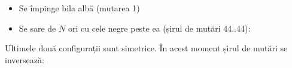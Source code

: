 \begin{itemize}

  \hfil\hdashrule{6cm}{1pt}{1pt 4pt}\hfil

\item Se împinge bila albă (mutarea 1)


\item Se sare de $N$ ori cu cele negre peste ea (șirul de mutări 44..44):


\end{itemize}

Ultimele două configurații sunt simetrice. În acest moment șirul de mutări se
inversează:

